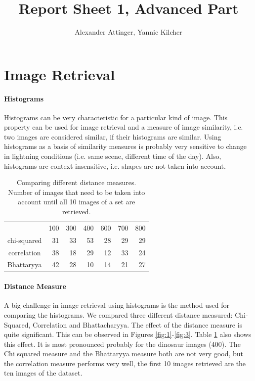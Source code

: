\documentclass[11pt,a4paper]{article}
\author{Alexander Attinger, Yannic Kilcher}
\title{Report Sheet 1, Advanced Part}
\begin{document}
\maketitle


\section{Image Retrieval}
\paragraph{Histograms}
Histograms can be very characteristic for a particular kind of image. This property can be used for image retrieval and a measure of image similarity, i.e. two images are considered similar, if their histograms are similar. Using histograms as a basis of similarity measures is probably very sensitive to change in lightning conditions (i.e. same scene, different time of the day). Also, histograms are context insensitive, i.e. shapes are not taken into account.
\begin{table}
\centering

\begin{tabular}{ |c | r | r | r | r | r | r | }
  \hline                        
   &100 & 300 & 400 & 600 & 700 & 800 \\
  chi-squared & 31 & 33 & 53 & 28 & 29 & 29 \\
  correlation & 38 & 18 & 29 & 12 & 33 & 24 \\
  Bhattaryya & 42 & 28 & 10 & 14 & 21 & 27 \\
  \hline  
  
\end{tabular}
\caption{Comparing different distance measures. Number of images that need to be taken into account until all 10 images of a set are retrieved.}
\label{table:1}
\end{table}

\paragraph{Distance Measure}
 A big challenge in image retrieval using histograms is the method used for comparing the histograms. We compared three different distance measured: Chi-Squared, Correlation and Bhattacharyya. The effect of the distance measure is quite significant. This can be observed in Figures \ref{fig:1}-\ref{fig:3}. Table \ref{table:1} also shows this effect. It is most pronounced probably for the dinosaur images (400). The Chi squared measure and the Bhattaryya measure both are not very good, but the correlation measure performs very well, the first 10 images retrieved are the ten images of the dataset.
 
\end{document}
